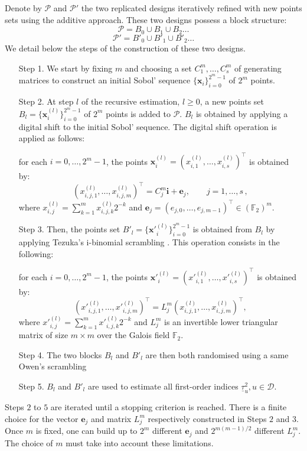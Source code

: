 \documentclass[]{elsarticle}
\theoremstyle{definition}
\newcommand{\bvec}[1]{\boldsymbol{#1}}
\newcommand{\vx}{\bvec{x}}
\newcommand{\vi}{\bvec{i}}
\newcommand{\ve}{\bvec{e}}
\begin{document}
Denote by $\mathcal{P}$ and $\mathcal{P}'$ the two replicated designs iteratively refined with new points sets using the additive approach. These two designs possess a block structure:
$$\mathcal{P}= B_0 \cup B_1 \cup B_2 \dots $$
$$\mathcal{P}'= {B'}_0 \cup {B'}_1 \cup {B'}_2 \dots $$
We detail below the steps of the construction of these two designs.
\begin{enumerate}
\item[Step 1.] We start by fixing $m$ and choosing a set $C_1^{m},\dots,C_s^{m}$ of generating matrices to construct an initial Sobol' sequence $\{\vx_i\}_{i=0}^{2^m-1}$ of $2^m$ points. \\

\item[Step 2.] At step $l$ of the recursive estimation, $l \geq 0$, a new points set $B_l=\{\vx_i^{(l)}\}_{i=0}^{2^m-1}$ of $2^m$ points is added to $\mathcal{P}$. $B_l$ is obtained by applying a digital shift to the initial Sobol' sequence. The digital shift operation is applied as follows:

for each $i=0,\dots,2^m-1$, the points $\vx_i^{(l)} = (x_{i,1}^{(l)},\dots,x_{i,s}^{(l)})^\intercal$ is obtained by:
\begin{equation}
\label{dig.shift}
(x_{i,j,1}^{(l)},\dots,x_{i,j,m}^{(l)})^\intercal = C_j^m \vi+\ve_j,\qquad j= 1,\dots,s\, ,
\end{equation}
where $ x_{i,j}^{(l)}=\sum_{k = 1}^mx_{i,j,k}^{(l)}2^{-k}$ and $\ve_j=(e_{j,{0}},\dots,e_{j,{m-1}})^\intercal \in (\mathbb{F}_2)^m$.\\

\item[Step 3.] Then, the points set ${B'}_l=\{{\vx'}_i^{(l)}\}_{i=0}^{2^m-1}$ is obtained from $B_l$ by applying Tezuka's i-binomial scrambling \cite{tezuka}. This operation consists in the following: 

for each $i=0,\dots,2^m-1$, the points ${\vx'}_i^{(l)} = ({x'}_{i,1}^{(l)},\dots,{x'}_{i,s}^{(l)})^\intercal$ is obtained by:
\begin{equation}
\label{ibinom.scrambling}
({x'}_{i,j,1}^{(l)},\dots,{x'}_{i,j,m}^{(l)})^\intercal = L_j^m (x_{i,j,1}^{(l)},\dots,x_{i,j,m}^{(l)})^\intercal,
\end{equation}
where $ {x'}_{i,j}^{(l)}=\sum_{k = 1}^m{x'}_{i,j,k}^{(l)}2^{-k}$ and $L_j^m$ is an invertible lower triangular matrix of size $m \times m$ over the Galois field $\mathbb{F}_2$.\\

\item[Step 4.] The two blocks $B_l$ and ${B'}_l$ are then both randomised using a same Owen's scrambling \cite{owen.scrambl}

\item[Step 5.] $B_l$ and ${B'}_l$ are used to estimate all first-order indices $\underline{\tau}_u^2, u \in \mathcal{D}$.
\end{enumerate}
Steps $2$ to $5$ are iterated until a stopping criterion is reached. There is a finite choice for the vector $\ve_j$ and matrix $L_j^m$ respectively constructed in Steps $2$ and $3$. Once $m$ is fixed, one can build up to $2^m$ different $\ve_j$ and $2^{m(m-1)/2}$ different $L_j^m$. The choice of $m$ must take into account these limitations.
\end{document}
